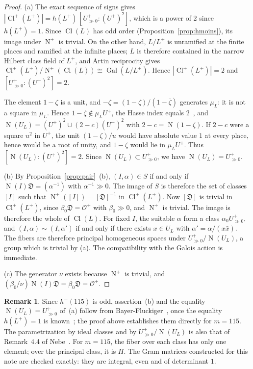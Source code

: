 \documentclass[11pt,a4paper]{amsart}
\theoremstyle{plain}
\theoremstyle{definition}
\newtheorem{remark}[theorem]{Remark}
\numberwithin{equation}{section}
\newcommand{\Op}{\mathcal{O}^{+}}
\newcommand{\Dif}{\mathfrak{D}}
\DeclareMathOperator{\Nm}{N}
\DeclareMathOperator{\Cl}{Cl}
\DeclareMathOperator{\Gal}{Gal}
\newcommand{\Clp}{\Cl^{+}}
\newcommand{\Up}{U^{+}}
\newcommand{\Upp}{U^{+}_{\gg0}}
\begin{document}
\begin{proof}
(a) The exact sequence of signs gives $|\Clp(L^+)|=h(L^+)\,[\Upp:(\Up)^2]$, which is a power of $2$ since $h(L^+)=1$. Since $\Cl(L)$ has odd order (Proposition~\ref{prop:hmoins}), its image under $\Nm^+$ is trivial. On the other hand, $L/L^+$ is unramified at the finite places and ramified at the infinite places; $L$ is therefore contained in the narrow Hilbert class field of $L^+$, and Artin reciprocity gives $\Clp(L^+)/\Nm^+(\Cl(L))\cong\Gal(L/L^+)$. Hence $|\Clp(L^+)|=2$ and $[\Upp:(\Up)^2]=2$.

The element $1-\zeta$ is a unit, and $-\zeta=(1-\zeta)/(1-\bar\zeta)$ generates $\mu_L$: it is not a square in $\mu_L$. Hence $1-\zeta\notin\mu_L\Up$, the Hasse index equals $2$~\cite[Thm.~4.12, Cor.~4.13]{Was97}, and $\Nm(U_L)=(\Up)^2\cup(2-c)(\Up)^2$ with $2-c=\Nm(1-\zeta)$. If $2-c$ were a square $u^2$ in $\Up$, the unit $(1-\zeta)/u$ would have absolute value $1$ at every place, hence would be a root of unity, and $1-\zeta$ would lie in $\mu_L\Up$. Thus $[\Nm(U_L):(\Up)^2]=2$. Since $\Nm(U_L)\subset\Upp$, we have $\Nm(U_L)=\Upp$.

(b) By Proposition~\ref{prop:pair}~(b), $(I,\alpha)\in S$ if and only if $\Nm(I)\Dif=(\alpha^{-1})$ with $\alpha^{-1}\gg0$. The image of $S$ is therefore the set of classes $[I]$ such that $\Nm^+([I])=[\Dif]^{-1}$ in $\Clp(L^+)$. Now $[\Dif]$ is trivial in $\Clp(L^+)$, since $\beta_0\Dif=\Op$ with $\beta_0\gg0$, and $\Nm^+$ is trivial. The image is therefore the whole of $\Cl(L)$. For fixed $I$, the suitable $\alpha$ form a class $\alpha_0\Upp$, and $(I,\alpha)\sim(I,\alpha')$ if and only if there exists $x\in U_L$ with $\alpha'=\alpha/(x\bar x)$. The fibers are therefore principal homogeneous spaces under $\Upp/\Nm(U_L)$, a group which is trivial by (a). The compatibility with the Galois action is immediate.

(c) The generator $\nu$ exists because $\Nm^+$ is trivial, and $(\beta_0/\nu)\Nm(I)\Dif=\beta_0\Dif=\Op$.
\end{proof}

\begin{remark}
Since $h^-(115)$ is odd, assertion~(b) and the equality $\Nm(U_L)=\Upp$ of~(a) follow from Bayer-Fluckiger~\cite[Prop.~3.1 and Lemma~3.2~a)]{Bay84}, once the equality $h(L^+)=1$ is known~\cite{Mil14}; the proof above establishes them directly for $m=115$. The parametrization by ideal classes and by $\Upp/\Nm(U_L)$ is also that of Remark~4.4 of Nebe~\cite{Neb16}. For $m=115$, the fiber over each class has only one element; over the principal class, it is $H$. The Gram matrices constructed for this note are checked exactly: they are integral, even and of determinant $1$.
\end{remark}
\end{document}
